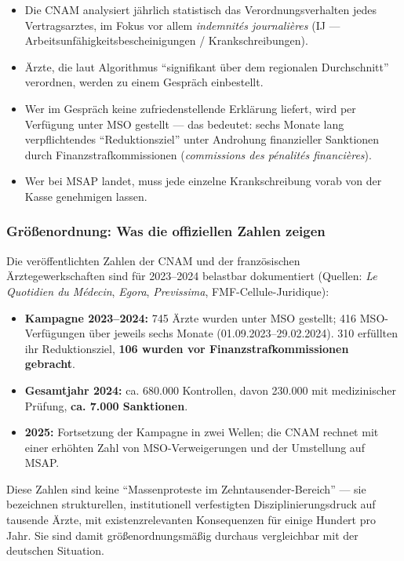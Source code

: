 \documentclass{umbruch-position}
\begin{document}
\begin{itemize}[nosep]
  \item Die CNAM analysiert jährlich statistisch das Verordnungsverhalten jedes Vertragsarztes, im Fokus vor allem \textit{indemnit\'es journali\`eres} (IJ --- Arbeitsunfähigkeitsbescheinigungen / Krankschreibungen).
  \item Ärzte, die laut Algorithmus ``signifikant über dem regionalen Durchschnitt'' verordnen, werden zu einem Gespräch einbestellt.
  \item Wer im Gespräch keine zufriedenstellende Erklärung liefert, wird per Verfügung unter MSO gestellt --- das bedeutet: sechs Monate lang verpflichtendes ``Reduktionsziel'' unter Androhung finanzieller Sanktionen durch Finanzstrafkommissionen (\textit{commissions des p\'enalit\'es financi\`eres}).
  \item Wer bei MSAP landet, muss jede einzelne Krankschreibung vorab von der Kasse genehmigen lassen.
\end{itemize}

\subsubsection{Größenordnung: Was die offiziellen Zahlen zeigen}

Die veröffentlichten Zahlen der CNAM und der französischen Ärztegewerkschaften sind für 2023--2024 belastbar dokumentiert (Quellen: \textit{Le Quotidien du M\'edecin}, \textit{Egora}, \textit{Previssima}, FMF-Cellule-Juridique):

\begin{itemize}[nosep]
  \item \textbf{Kampagne 2023--2024:} 745 Ärzte wurden unter MSO gestellt; 416 MSO-Verfügungen über jeweils sechs Monate (01.09.2023--29.02.2024). 310 erfüllten ihr Reduktionsziel, \textbf{106 wurden vor Finanzstrafkommissionen gebracht}.
  \item \textbf{Gesamtjahr 2024:} ca. 680.000 Kontrollen, davon 230.000 mit medizinischer Prüfung, \textbf{ca. 7.000 Sanktionen}.
  \item \textbf{2025:} Fortsetzung der Kampagne in zwei Wellen; die CNAM rechnet mit einer erhöhten Zahl von MSO-Verweigerungen und der Umstellung auf MSAP.
\end{itemize}

Diese Zahlen sind keine ``Massenproteste im Zehntausender-Bereich'' --- sie bezeichnen strukturellen, institutionell verfestigten Disziplinierungsdruck auf tausende Ärzte, mit existenzrelevanten Konsequenzen für einige Hundert pro Jahr. Sie sind damit größenordnungsmäßig durchaus vergleichbar mit der deutschen Situation.
\end{document}
